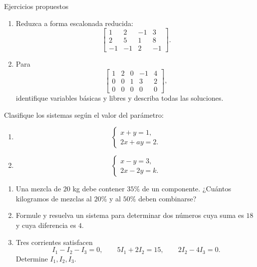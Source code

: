 \documentclass[aspectratio=169,9pt]{beamer}
\theoremstyle{remark}
\begin{document}
\begin{frame}[allowframebreaks,t]{Ejercicios propuestos}
\par{}\par\smallskip
\begin{enumerate}
\item Reduzca a forma escalonada reducida:
\[
\left[
\begin{array}{ccc|c}
1&2&-1&3\\
2&5&1&8\\
-1&-1&2&-1
\end{array}
\right].
\]
\item Para
\[
\left[
\begin{array}{cccc|c}
1&2&0&-1&4\\
0&0&1&3&2\\
0&0&0&0&0
\end{array}
\right],
\]
identifique variables básicas y libres y describa todas las soluciones.
\end{enumerate}

\par{}\par\smallskip
Clasifique los sistemas según el valor del parámetro:
\begin{enumerate}
\item
\[
\begin{cases}
x+y=1,\\
2x+ay=2.
\end{cases}
\]
\item
\[
\begin{cases}
x-y=3,\\
2x-2y=k.
\end{cases}
\]
\end{enumerate}

\par{}\par\smallskip
\begin{enumerate}
\item Una mezcla de $20$ kg debe contener $35\%$ de un componente. ¿Cuántos kilogramos de mezclas
al $20\%$ y al $50\%$ deben combinarse?
\item Formule y resuelva un sistema para determinar dos números cuya suma es $18$ y cuya diferencia
es $4$.
\item Tres corrientes satisfacen
\[
I_1-I_2-I_3=0,\qquad 5I_1+2I_2=15,\qquad 2I_2-4I_3=0.
\]
Determine $I_1,I_2,I_3$.
\end{enumerate}
\end{frame}
\end{document}
